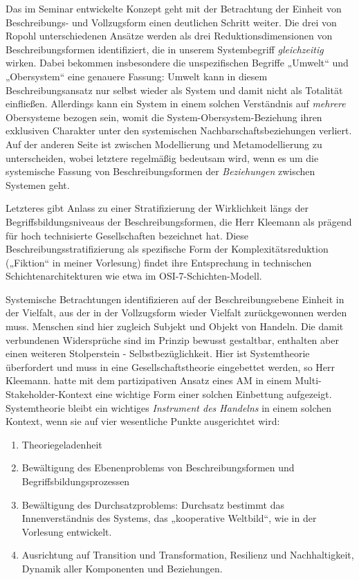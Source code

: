 \documentclass[11pt,a4paper]{article}
\begin{document}
Das im Seminar entwickelte Konzept geht mit der Betrachtung der Einheit von
Beschreibungs- und Vollzugsform einen deutlichen Schritt weiter. Die drei von
Ropohl unterschiedenen An\-sätze werden als drei Reduktionsdimensionen von
Beschreibungsformen identifiziert, die in unserem Systembegriff
\emph{gleichzeitig} wirken. Dabei bekommen insbesondere die unspezifischen
Begriffe „Umwelt“ und „Obersystem“ eine genauere Fassung: Umwelt kann in
diesem Beschreibungsansatz nur selbst wieder als System und damit nicht als
Totalität einfließen.  Allerdings kann ein System in einem solchen Verständnis
auf \emph{mehrere} Obersysteme bezogen sein, womit die
System-Obersystem-Beziehung ihren exklusiven Charakter unter den systemischen
Nachbarschaftsbeziehungen verliert. Auf der anderen Seite ist zwischen
Modellierung und Metamodellierung zu unterscheiden, wobei letztere regelmäßig
bedeutsam wird, wenn es um die systemische Fassung von Beschreibungsformen der
\emph{Beziehungen} zwischen Systemen geht.

Letzteres gibt Anlass zu einer Stratifizierung der Wirklichkeit längs der
Begriffsbildungsniveaus der Beschreibungsformen, die Herr Kleemann als prägend
für hoch technisierte Gesellschaften bezeichnet hat. Diese
Beschreibungsstratifizierung als spezifische Form der Komplexitätsreduktion
(„Fiktion“ in meiner Vorlesung) findet ihre Entsprechung in technischen
Schichtenarchitekturen wie etwa im OSI-7-Schichten-Modell.

Systemische Betrachtungen identifizieren auf der Beschreibungsebene Einheit in
der Vielfalt, aus der in der Vollzugsform wieder Vielfalt zurückgewonnen
werden muss. Menschen sind hier zugleich Subjekt und Objekt von Handeln. Die
damit verbundenen Widersprüche sind im Prinzip bewusst gestaltbar, enthalten
aber einen weiteren Stolperstein - Selbstbezüglichkeit. Hier ist Systemtheorie
überfordert und muss in eine Gesellschaftstheorie eingebettet werden, so Herr
Kleemann. \cite{Foxon2009} hatte mit dem partizipativen Ansatz eines AM in einem
Multi-Stakeholder-Kontext eine wichtige Form einer solchen Einbettung
aufgezeigt. Systemtheorie bleibt ein wichtiges \emph{Instrument des Handelns}
in einem solchen Kontext, wenn sie auf vier wesentliche Punkte ausgerichtet
wird:
\begin{enumerate}[noitemsep]
\item Theoriegeladenheit
\item Bewältigung des Ebenenproblems von Beschreibungsformen und
  Begriffsbildungsprozessen
\item Bewältigung des Durchsatzproblems: Durchsatz bestimmt das
  Innenverständnis des Systems, das „kooperative Weltbild“, wie in der
  Vorlesung entwickelt.
\item Ausrichtung auf Transition und Transformation, Resilienz und
  Nachhaltigkeit, Dynamik aller Komponenten und Beziehungen.
\end{enumerate}
\end{document}

